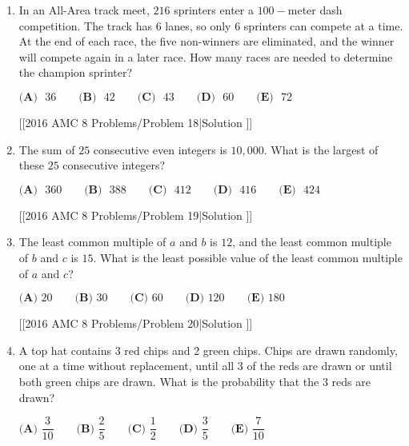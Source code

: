 \documentclass{article}
\begin{document}
\begin{enumerate}[label=\arabic*., itemsep=0.5em]
[[2016 AMC 8 Problems/Problem 17|Solution
]]\par \vspace{0.5em}\item In an All-Area track meet, \(216\) sprinters enter a \(100-\)meter dash competition. The track has \(6\) lanes, so only \(6\) sprinters can compete at a time. At the end of each race, the five non-winners are eliminated, and the winner will compete again in a later race. How many races are needed to determine the champion sprinter?

\(\textbf{(A)}\mbox{ }36\qquad\textbf{(B)}\mbox{ }42\qquad\textbf{(C)}\mbox{ }43\qquad\textbf{(D)}\mbox{ }60\qquad\textbf{(E)}\mbox{ }72\)

[[2016 AMC 8 Problems/Problem 18|Solution
]]\par \vspace{0.5em}\item The sum of \(25\) consecutive even integers is \(10,000\). What is the largest of these \(25\) consecutive integers?

\(\textbf{(A)}\mbox{ }360\qquad\textbf{(B)}\mbox{ }388\qquad\textbf{(C)}\mbox{ }412\qquad\textbf{(D)}\mbox{ }416\qquad\textbf{(E)}\mbox{ }424\)

[[2016 AMC 8 Problems/Problem 19|Solution
]]\par \vspace{0.5em}\item The least common multiple of \(a\) and \(b\) is \(12\), and the least common multiple of \(b\) and \(c\) is \(15\). What is the least possible value of the least common multiple of \(a\) and \(c\)?

\(\textbf{(A) }20\qquad\textbf{(B) }30\qquad\textbf{(C) }60\qquad\textbf{(D) }120\qquad \textbf{(E) }180\)

[[2016 AMC 8 Problems/Problem 20|Solution
]]\par \vspace{0.5em}\item A top hat contains 3 red chips and 2 green chips. Chips are drawn randomly, one at a time without replacement, until all 3 of the reds are drawn or until both green chips are drawn. What is the probability that the 3 reds are drawn?

\(\textbf{(A) }\dfrac{3}{10}\qquad\textbf{(B) }\dfrac{2}{5}\qquad\textbf{(C) }\dfrac{1}{2}\qquad\textbf{(D) }\dfrac{3}{5}\qquad \textbf{(E) }\dfrac{7}{10}\)


\end{enumerate}
\end{document}
